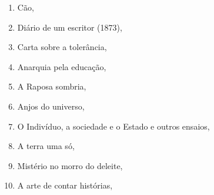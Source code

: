 \begin{multicols}{2}
\begin{enumerate}
\item Cão, {}
\item Diário de um escritor (1873), {}
\item Carta sobre a tolerância, {}
\item Anarquia pela educação, {}
\item A Raposa sombria, {}
\item Anjos do universo, {}
\item O Indivíduo, a sociedade e o Estado e outros ensaios, {}
\item A terra uma só, {}
\item Mistério no morro do deleite, {}
\item A arte de contar histórias, {}
\end{enumerate}
\end{multicols}

\medskip

{}\\

